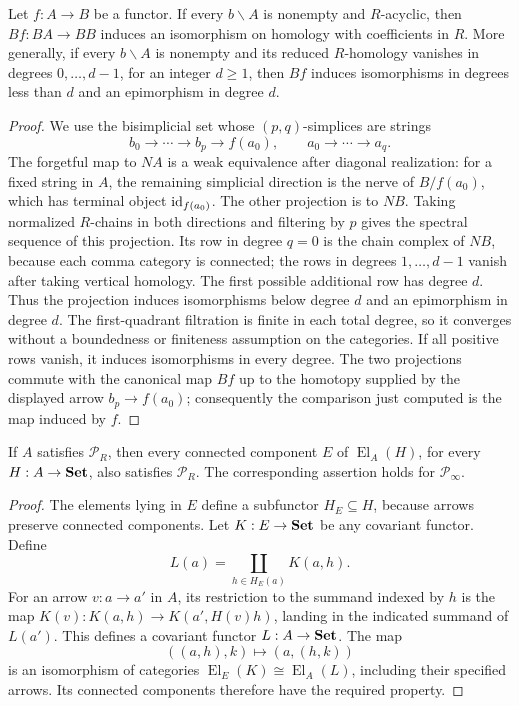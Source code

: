 \begin{nrlemma}\label{NR:C:homology-A}
Let $f:A\to B$ be a functor. If every $b\backslash A$ is nonempty and $R$-acyclic, then $Bf:BA\to BB$ induces an isomorphism on homology with coefficients in $R$. More generally, if every $b\backslash A$ is nonempty and its reduced $R$-homology vanishes in degrees $0,\ldots,d-1$, for an integer $d\geq1$, then $Bf$ induces isomorphisms in degrees less than $d$ and an epimorphism in degree $d$.
\end{nrlemma}
\begin{proof}
We use the bisimplicial set whose $(p,q)$-simplices are strings
\[
 b_0\longrightarrow\cdots\longrightarrow b_p
 \longrightarrow f(a_0),\qquad
 a_0\longrightarrow\cdots\longrightarrow a_q.
\]
The forgetful map to $NA$ is a weak equivalence after diagonal realization: for a fixed string in $A$, the remaining simplicial direction is the nerve of $B/f(a_0)$, which has terminal object $\operatorname{id}_{f(a_0)}$. The other projection is to $NB$. Taking normalized $R$-chains in both directions and filtering by $p$ gives the spectral sequence of this projection. Its row in degree $q=0$ is the chain complex of $NB$, because each comma category is connected; the rows in degrees $1,\ldots,d-1$ vanish after taking vertical homology. The first possible additional row has degree $d$. Thus the projection induces isomorphisms below degree $d$ and an epimorphism in degree $d$. The first-quadrant filtration is finite in each total degree, so it converges without a boundedness or finiteness assumption on the categories. If all positive rows vanish, it induces isomorphisms in every degree. The two projections commute with the canonical map $Bf$ up to the homotopy supplied by the displayed arrow $b_p\to f(a_0)$; consequently the comparison just computed is the map induced by $f$.
\end{proof}

\begin{nrlemma}\label{NR:C:inherit-elements}
If $A$ satisfies $\mathcal P_R$, then every connected component $E$ of $\operatorname{El}_A(H)$, for every $H:A\to\mathbf{Set}$, also satisfies $\mathcal P_R$. The corresponding assertion holds for $\mathcal P_\infty$.
\end{nrlemma}
\begin{proof}
The elements lying in $E$ define a subfunctor $H_E\subseteq H$, because arrows preserve connected components. Let $K:E\to\mathbf{Set}$ be any covariant functor. Define
\[
 L(a)=\coprod_{h\in H_E(a)}K(a,h).
\]
For an arrow $v:a\to a'$ in $A$, its restriction to the summand indexed by $h$ is the map $K(v):K(a,h)\to K(a',H(v)h)$, landing in the indicated summand of $L(a')$. This defines a covariant functor $L:A\to\mathbf{Set}$. The map
\[
 ((a,h),k)\longmapsto (a,(h,k))
\]
is an isomorphism of categories $\operatorname{El}_E(K)\cong\operatorname{El}_A(L)$, including their specified arrows. Its connected components therefore have the required property.
\end{proof}

